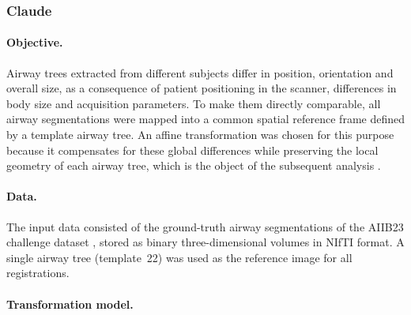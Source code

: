 
\subsubsection{Claude}           %
\label{sec:affine_claude}        %

\newcommand{\ncases}{\TODO{N}}                %
\newcommand{\antspyversion}{\TODO{x.y.z}}     %

\paragraph{Objective.}           %

Airway trees extracted from different subjects differ in position, orientation
and overall size, as a consequence of patient positioning in the scanner,
differences in body size and acquisition parameters. To make them directly
comparable, all airway segmentations were mapped into a common spatial
reference frame defined by a template airway tree. An affine transformation was
chosen for this purpose because it compensates for these global differences
while preserving the local geometry of each airway tree, which is the object of
the subsequent analysis \cite{maintz1998survey}.

\paragraph{Data.}                %

The input data consisted of the \ncases{} ground-truth airway segmentations of
the AIIB23 challenge dataset \cite{nan2024aiib23}, stored as binary
three-dimensional volumes in NIfTI format. A single airway tree (template~22)
was used as the reference image for all registrations.

\paragraph{Transformation model.}  %

